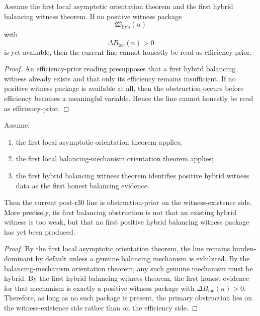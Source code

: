 \begin{proposition}
\label{prop:asymptotic-burden-dominance-blocks-efficiency-first-readings}
Assume the first local asymptotic orientation theorem and the first hybrid balancing witness theorem.
If no positive witness package
\[
  \mathfrak W_{\mathrm{hyb}}(n)
\]
with
\[
  \Delta B_{\mathrm{loc}}(n)>0
\]
is yet available, then the current line cannot honestly be read as efficiency-prior.
\end{proposition}

\begin{proof}
An efficiency-prior reading presupposes that a first hybrid balancing witness already exists and that only its efficiency remains insufficient. If no positive witness package is available at all, then the obstruction occurs before efficiency becomes a meaningful variable. Hence the line cannot honestly be read as efficiency-prior.
\end{proof}

\begin{theorem}
\label{thm:first-hybrid-obstruction-orientation-theorem}
Assume:
\begin{enumerate}[leftmargin=2em,label=(\alph*)]
  \item the first local asymptotic orientation theorem applies;
  \item the first local balancing-mechanism orientation theorem applies;
  \item the first hybrid balancing witness theorem identifies positive hybrid witness data as the first honest balancing evidence.
\end{enumerate}
Then the current post-r30 line is obstruction-prior on the witness-existence side.
More precisely, its first balancing obstruction is not that an existing hybrid witness is too weak, but that no first positive hybrid balancing witness package has yet been produced.
\end{theorem}

\begin{proof}
By the first local asymptotic orientation theorem, the line remains burden-dominant by default unless a genuine balancing mechanism is exhibited. By the balancing-mechanism orientation theorem, any such genuine mechanism must be hybrid. By the first hybrid balancing witness theorem, the first honest evidence for that mechanism is exactly a positive witness package with \(\Delta B_{\mathrm{loc}}(n)>0\). Therefore, as long as no such package is present, the primary obstruction lies on the witness-existence side rather than on the efficiency side.
\end{proof}

